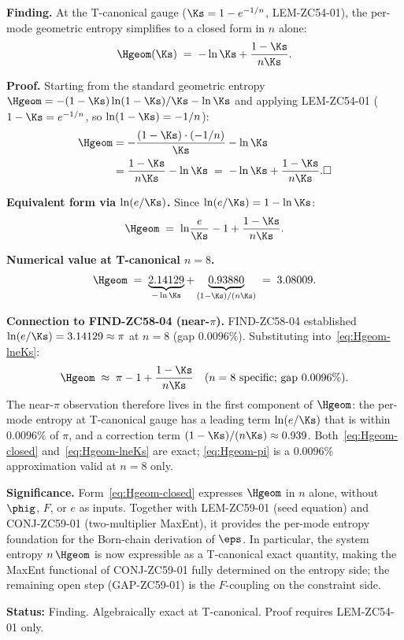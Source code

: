 \documentclass[12pt, a4paper]{article}
\begin{document}
\begin{derivedbox}[title={FIND-ZC59-03: Per-Mode Entropy Closed Form
  $H_{\rm geom} = -\ln\Ks + (1-\Ks)/(n\Ks)$ ($R_0$, Exact)}]
\textbf{Finding.}
At the T-canonical gauge ($\Ks = 1-e^{-1/n}$, LEM-ZC54-01),
the per-mode geometric entropy simplifies to a closed form in
$n$ alone:
\begin{equation}\label{eq:Hgeom-closed}
  \Hgeom(\Ks)
  \;=\; -\ln\Ks + \frac{1-\Ks}{n\Ks}.
\end{equation}

\textbf{Proof.}
Starting from the standard geometric entropy
$\Hgeom = -(1-\Ks)\ln(1-\Ks)/\Ks - \ln\Ks$
and applying LEM-ZC54-01 ($1-\Ks = e^{-1/n}$,
so $\ln(1-\Ks) = -1/n$):
\begin{align*}
  \Hgeom
  &= -\frac{(1-\Ks)\cdot(-1/n)}{\Ks} - \ln\Ks \\
  &= \frac{1-\Ks}{n\Ks} - \ln\Ks
  \;=\; -\ln\Ks + \frac{1-\Ks}{n\Ks}.
  \hfill\square
\end{align*}

\textbf{Equivalent form via $\ln(e/\Ks)$.}
Since $\ln(e/\Ks) = 1 - \ln\Ks$:
\begin{equation}\label{eq:Hgeom-lneKs}
  \Hgeom
  \;=\; \ln\!\frac{e}{\Ks} - 1 + \frac{1-\Ks}{n\Ks}.
\end{equation}

\textbf{Numerical value at T-canonical $n=8$.}
\[
  \Hgeom
  \;=\; \underbrace{2.14129}_{{-\ln\Ks}}
       +\underbrace{0.93880}_{{(1-\Ks)/(n\Ks)}}
  \;=\; 3.08009.
\]

\textbf{Connection to FIND-ZC58-04 (near-$\pi$).}
FIND-ZC58-04 established $\ln(e/\Ks) = 3.14129\approx\pi$ at $n=8$
(gap $0.0096\%$).  Substituting into~\eqref{eq:Hgeom-lneKs}:
\begin{equation}\label{eq:Hgeom-pi}
  \Hgeom
  \;\approx\; \pi - 1 + \frac{1-\Ks}{n\Ks}
  \quad (n=8\text{ specific; gap }0.0096\%).
\end{equation}
The near-$\pi$ observation therefore lives in the first component
of $\Hgeom$: the per-mode entropy at T-canonical gauge has a
leading term $\ln(e/\Ks)$ that is within $0.0096\%$ of $\pi$,
and a correction term $(1-\Ks)/(n\Ks) \approx 0.939$.
Both~\eqref{eq:Hgeom-closed} and~\eqref{eq:Hgeom-lneKs} are
exact; \eqref{eq:Hgeom-pi} is a $0.0096\%$ approximation
valid at $n=8$ only.

\textbf{Significance.}
Form~\eqref{eq:Hgeom-closed} expresses $\Hgeom$ in $n$ alone,
without $\phig$, $F$, or $e$ as inputs.  Together with
LEM-ZC59-01 (seed equation) and CONJ-ZC59-01 (two-multiplier
MaxEnt), it provides the per-mode entropy foundation for the
Born-chain derivation of $\eps$.  In particular, the system
entropy $n\,\Hgeom$ is now expressible as a T-canonical exact
quantity, making the MaxEnt functional of CONJ-ZC59-01
fully determined on the entropy side; the remaining open
step (GAP-ZC59-01) is the $F$-coupling on the constraint side.

\textbf{Status:} Finding.  Algebraically exact at T-canonical.
Proof requires LEM-ZC54-01 only.
\end{derivedbox}
\end{document}
